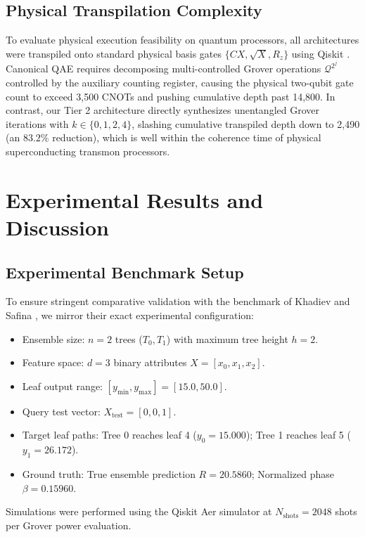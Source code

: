 \documentclass[conference]{IEEEtran}
\begin{document}
\subsection{Physical Transpilation Complexity}\label{subsec5.1}

To evaluate physical execution feasibility on quantum processors, all architectures were transpiled onto standard physical basis gates $\{CX, \sqrt{X}, R_z\}$ using Qiskit \cite{aleksandrowicz2019qiskit}. Canonical QAE requires decomposing multi-controlled Grover operations $\mathcal{Q}^{2^j}$ controlled by the auxiliary counting register, causing the physical two-qubit gate count to exceed 3,500 CNOTs and pushing cumulative depth past 14,800. In contrast, our Tier 2 architecture directly synthesizes unentangled Grover iterations with $k \in \{0, 1, 2, 4\}$, slashing cumulative transpiled depth down to 2,490 (an $83.2\%$ reduction), which is well within the coherence time of physical superconducting transmon processors.

\section{Experimental Results and Discussion}\label{sec6}

\subsection{Experimental Benchmark Setup}\label{subsec6.1}

To ensure stringent comparative validation with the benchmark of Khadiev and Safina \cite{khadiev2026quantum}, we mirror their exact experimental configuration:
\begin{itemize}
    \item Ensemble size: $n = 2$ trees ($T_0, T_1$) with maximum tree height $h = 2$.
    \item Feature space: $d = 3$ binary attributes $X = [x_0, x_1, x_2]$.
    \item Leaf output range: $[y_{\min}, y_{\max}] = [15.0, 50.0]$.
    \item Query test vector: $X_{\text{test}} = [0, 0, 1]$.
    \item Target leaf paths: Tree 0 reaches leaf 4 ($y_0 = 15.000$); Tree 1 reaches leaf 5 ($y_1 = 26.172$).
    \item Ground truth: True ensemble prediction $R = 20.5860$; Normalized phase $\beta = 0.15960$.
\end{itemize}
Simulations were performed using the Qiskit Aer simulator at $N_{\text{shots}} = 2048$ shots per Grover power evaluation.
\end{document}
